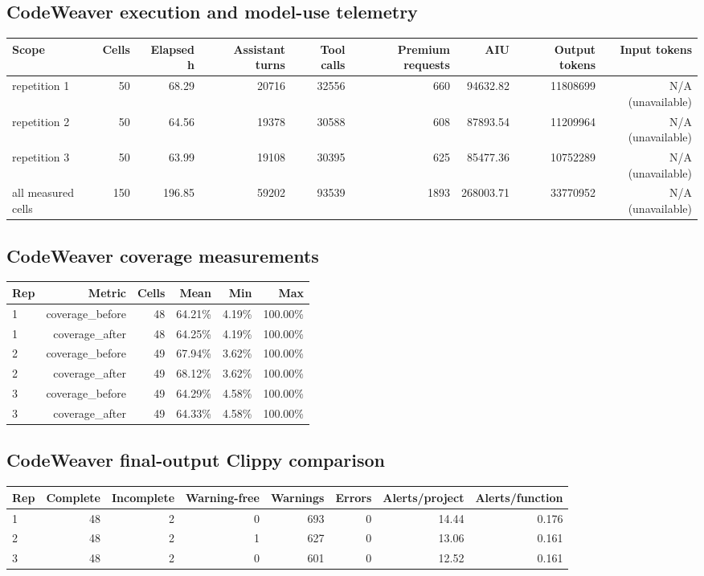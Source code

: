 \documentclass{article}
\begin{document}
\subsection*{CodeWeaver execution and model-use telemetry}

\begin{tabular}{lrrrrrrrr}
\toprule
Scope & Cells & Elapsed h & Assistant turns & Tool calls & Premium requests & AIU & Output tokens & Input tokens \\
\midrule
repetition 1 & 50 & 68.29 & 20716 & 32556 & 660 & 94632.82 & 11808699 & N/A (unavailable) \\
repetition 2 & 50 & 64.56 & 19378 & 30588 & 608 & 87893.54 & 11209964 & N/A (unavailable) \\
repetition 3 & 50 & 63.99 & 19108 & 30395 & 625 & 85477.36 & 10752289 & N/A (unavailable) \\
all measured cells & 150 & 196.85 & 59202 & 93539 & 1893 & 268003.71 & 33770952 & N/A (unavailable) \\
\bottomrule
\end{tabular}

\subsection*{CodeWeaver coverage measurements}

\begin{tabular}{lrrrrr}
\toprule
Rep & Metric & Cells & Mean & Min & Max \\
\midrule
1 & coverage\_before & 48 & 64.21\% & 4.19\% & 100.00\% \\
1 & coverage\_after & 48 & 64.25\% & 4.19\% & 100.00\% \\
2 & coverage\_before & 49 & 67.94\% & 3.62\% & 100.00\% \\
2 & coverage\_after & 49 & 68.12\% & 3.62\% & 100.00\% \\
3 & coverage\_before & 49 & 64.29\% & 4.58\% & 100.00\% \\
3 & coverage\_after & 49 & 64.33\% & 4.58\% & 100.00\% \\
\bottomrule
\end{tabular}

\subsection*{CodeWeaver final-output Clippy comparison}

\begin{tabular}{lrrrrrrr}
\toprule
Rep & Complete & Incomplete & Warning-free & Warnings & Errors & Alerts/project & Alerts/function \\
\midrule
1 & 48 & 2 & 0 & 693 & 0 & 14.44 & 0.176 \\
2 & 48 & 2 & 1 & 627 & 0 & 13.06 & 0.161 \\
3 & 48 & 2 & 0 & 601 & 0 & 12.52 & 0.161 \\
\bottomrule
\end{tabular}
\end{document}
